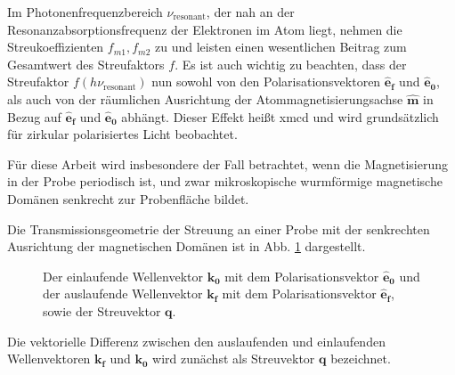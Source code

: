 \noindent
Im Photonenfrequenzbereich $\nu_\text{resonant}$, der nah an der Resonanzabsorptionsfrequenz der Elektronen im Atom liegt, nehmen die Streukoeffizienten $f_{m1}, f_{m2}$ zu und leisten einen wesentlichen Beitrag zum Gesamtwert des Streufaktors $f$. Es ist auch wichtig zu beachten, dass der Streufaktor $f(h\nu_\text{resonant})$ nun sowohl von den Polarisationsvektoren $\mathbf{\hat{e}_f}$ und $\mathbf{\hat{e}_0}$, als auch von der räumlichen Ausrichtung der Atommagnetisierungsachse $\mathbf{\hat{m}}$ in Bezug auf $\mathbf{\hat{e}_f}$ und $\mathbf{\hat{e}_0}$ abhängt. Dieser Effekt heißt \gls{xmcd} und wird grundsätzlich für zirkular polarisiertes Licht beobachtet.

\noindent
Für diese Arbeit wird insbesondere der Fall betrachtet, wenn die Magnetisierung in der Probe periodisch ist, und zwar mikroskopische wurmförmige magnetische Domänen senkrecht zur Probenfläche bildet. %

\noindent
Die Transmissionsgeometrie der Streuung an einer Probe mit der senkrechten Ausrichtung der magnetischen Domänen ist in Abb. \ref{fig:transmission_geometrie} dargestellt.
\begin{figure}[H]
    \centering
    
    \caption{Der einlaufende Wellenvektor $\mathbf{k_0}$ mit dem Polarisationsvektor $\mathbf{\hat{e}_0}$ und der auslaufende Wellenvektor $\mathbf{k_f}$ mit dem Polarisationsvektor $\mathbf{\hat{e}_f}$, sowie der Streuvektor $\mathbf{q}$.}
    \label{fig:transmission_geometrie}
\end{figure}
\noindent
Die vektorielle Differenz zwischen den auslaufenden und einlaufenden Wellenvektoren $\mathbf{k_f}$ und $\mathbf{k_0}$ wird zunächst als Streuvektor $\mathbf{q}$ bezeichnet.

